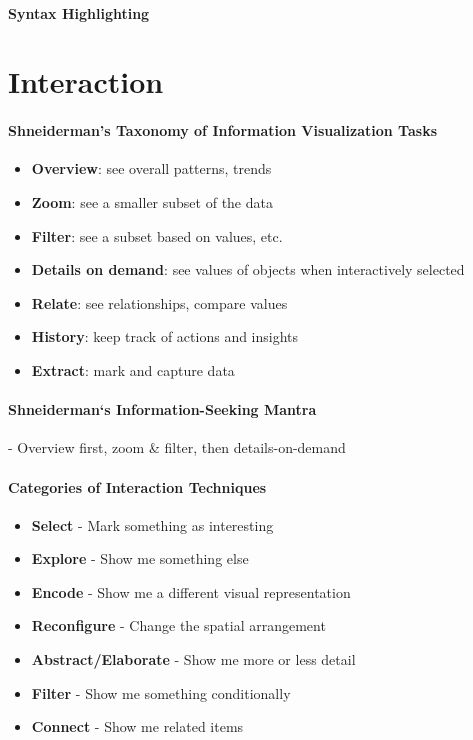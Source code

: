 \documentclass[10pt,a4paper]{article}
\begin{document}
	\paragraph{Syntax Highlighting}

\section{Interaction}
	\paragraph{Shneiderman’s Taxonomy of Information Visualization Tasks}
	\begin{itemize}
		\item \textbf{Overview}: see overall patterns, trends
		\item \textbf{Zoom}: see a smaller subset of the data
		\item \textbf{Filter}: see a subset based on values, etc.
		\item \textbf{Details on demand}: see values of objects when interactively selected
		\item \textbf{Relate}: see relationships, compare values
		\item \textbf{History}: keep track of actions and insights
		\item \textbf{Extract}: mark and capture data
	\end{itemize}

	\paragraph{Shneiderman‘s Information-Seeking Mantra} - Overview first, zoom \& filter, then details-on-demand

	\paragraph{Categories of Interaction Techniques}
	\begin{itemize}
		\item \textbf{Select} - Mark something as interesting
		\item \textbf{Explore} - Show me something else
		\item \textbf{Encode} - Show me a different visual representation
		\item \textbf{Reconfigure} - Change the spatial arrangement
		\item \textbf{Abstract/Elaborate} - Show me more or less detail
		\item \textbf{Filter} - Show me something conditionally
		\item \textbf{Connect} - Show me related items
	\end{itemize}
\end{document}
